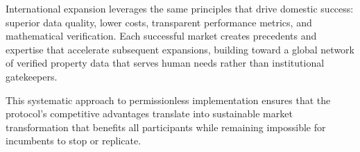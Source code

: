International expansion leverages the same principles that drive domestic success: superior data quality, lower costs, transparent performance metrics, and mathematical verification. Each successful market creates precedents and expertise that accelerate subsequent expansions, building toward a global network of verified property data that serves human needs rather than institutional gatekeepers.

This systematic approach to permissionless implementation ensures that the protocol's competitive advantages translate into sustainable market transformation that benefits all participants while remaining impossible for incumbents to stop or replicate.